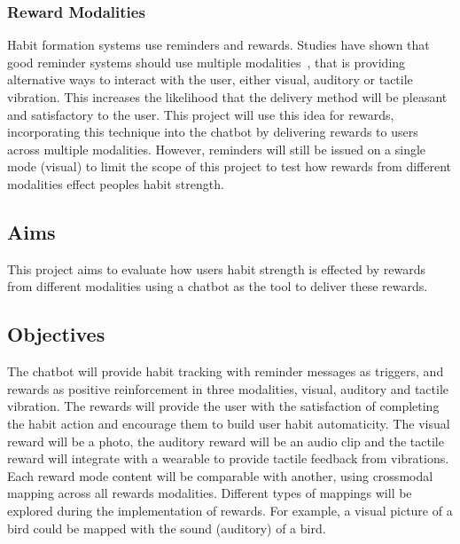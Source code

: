 \subsubsection*{Reward Modalities}
Habit formation systems use reminders and rewards. Studies have shown that good reminder systems should use multiple modalities~\cite{article_designing_multimodal_reminders_for_home}, that is providing alternative ways to interact with the user, either visual, auditory or tactile vibration. This increases the likelihood that the delivery method will be pleasant and satisfactory to the user. This project will use this idea for rewards, incorporating this technique into the chatbot by delivering rewards to users across multiple modalities. However, reminders will still be issued on a single mode (visual) to limit the scope of this project to test how rewards from different modalities effect peoples habit strength.

\subsection*{Aims}
This project aims to evaluate how users habit strength is effected by rewards from different modalities using a chatbot as the tool to deliver these rewards.

\subsection*{Objectives}
The chatbot will provide habit tracking with reminder messages as triggers, and rewards as positive reinforcement in three modalities, visual, auditory and tactile vibration.\newline
\newline
The rewards will provide the user with the satisfaction of completing the habit action and encourage them to build user habit automaticity. The visual reward will be a photo, the auditory reward will be an audio clip and the tactile reward will integrate with a wearable to provide tactile feedback from vibrations. Each reward mode content will be comparable with another, using crossmodal mapping across all rewards modalities. Different types of mappings will be explored during the implementation of rewards. For example, a visual picture of a bird could be mapped with the sound (auditory) of a bird.


